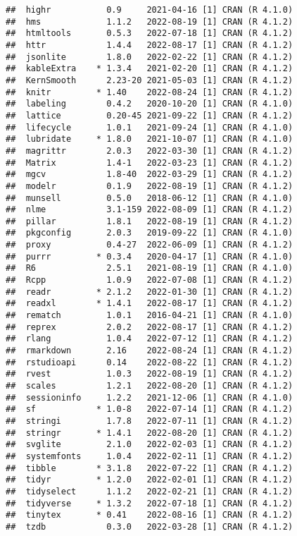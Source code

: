 \documentclass[
]{article}
\begin{document}
\begin{verbatim}
##  highr           0.9     2021-04-16 [1] CRAN (R 4.1.0)
##  hms             1.1.2   2022-08-19 [1] CRAN (R 4.1.2)
##  htmltools       0.5.3   2022-07-18 [1] CRAN (R 4.1.2)
##  httr            1.4.4   2022-08-17 [1] CRAN (R 4.1.2)
##  jsonlite        1.8.0   2022-02-22 [1] CRAN (R 4.1.2)
##  kableExtra    * 1.3.4   2021-02-20 [1] CRAN (R 4.1.2)
##  KernSmooth      2.23-20 2021-05-03 [1] CRAN (R 4.1.2)
##  knitr         * 1.40    2022-08-24 [1] CRAN (R 4.1.2)
##  labeling        0.4.2   2020-10-20 [1] CRAN (R 4.1.0)
##  lattice         0.20-45 2021-09-22 [1] CRAN (R 4.1.2)
##  lifecycle       1.0.1   2021-09-24 [1] CRAN (R 4.1.0)
##  lubridate     * 1.8.0   2021-10-07 [1] CRAN (R 4.1.0)
##  magrittr        2.0.3   2022-03-30 [1] CRAN (R 4.1.2)
##  Matrix          1.4-1   2022-03-23 [1] CRAN (R 4.1.2)
##  mgcv            1.8-40  2022-03-29 [1] CRAN (R 4.1.2)
##  modelr          0.1.9   2022-08-19 [1] CRAN (R 4.1.2)
##  munsell         0.5.0   2018-06-12 [1] CRAN (R 4.1.0)
##  nlme            3.1-159 2022-08-09 [1] CRAN (R 4.1.2)
##  pillar          1.8.1   2022-08-19 [1] CRAN (R 4.1.2)
##  pkgconfig       2.0.3   2019-09-22 [1] CRAN (R 4.1.0)
##  proxy           0.4-27  2022-06-09 [1] CRAN (R 4.1.2)
##  purrr         * 0.3.4   2020-04-17 [1] CRAN (R 4.1.0)
##  R6              2.5.1   2021-08-19 [1] CRAN (R 4.1.0)
##  Rcpp            1.0.9   2022-07-08 [1] CRAN (R 4.1.2)
##  readr         * 2.1.2   2022-01-30 [1] CRAN (R 4.1.2)
##  readxl        * 1.4.1   2022-08-17 [1] CRAN (R 4.1.2)
##  rematch         1.0.1   2016-04-21 [1] CRAN (R 4.1.0)
##  reprex          2.0.2   2022-08-17 [1] CRAN (R 4.1.2)
##  rlang           1.0.4   2022-07-12 [1] CRAN (R 4.1.2)
##  rmarkdown       2.16    2022-08-24 [1] CRAN (R 4.1.2)
##  rstudioapi      0.14    2022-08-22 [1] CRAN (R 4.1.2)
##  rvest           1.0.3   2022-08-19 [1] CRAN (R 4.1.2)
##  scales          1.2.1   2022-08-20 [1] CRAN (R 4.1.2)
##  sessioninfo     1.2.2   2021-12-06 [1] CRAN (R 4.1.0)
##  sf            * 1.0-8   2022-07-14 [1] CRAN (R 4.1.2)
##  stringi         1.7.8   2022-07-11 [1] CRAN (R 4.1.2)
##  stringr       * 1.4.1   2022-08-20 [1] CRAN (R 4.1.2)
##  svglite         2.1.0   2022-02-03 [1] CRAN (R 4.1.2)
##  systemfonts     1.0.4   2022-02-11 [1] CRAN (R 4.1.2)
##  tibble        * 3.1.8   2022-07-22 [1] CRAN (R 4.1.2)
##  tidyr         * 1.2.0   2022-02-01 [1] CRAN (R 4.1.2)
##  tidyselect      1.1.2   2022-02-21 [1] CRAN (R 4.1.2)
##  tidyverse     * 1.3.2   2022-07-18 [1] CRAN (R 4.1.2)
##  tinytex       * 0.41    2022-08-16 [1] CRAN (R 4.1.2)
##  tzdb            0.3.0   2022-03-28 [1] CRAN (R 4.1.2)

\end{verbatim}
\end{document}
